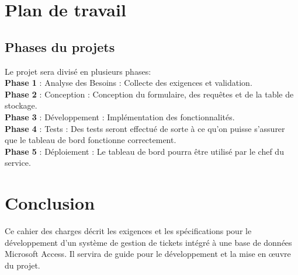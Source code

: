 \documentclass[a4paper,12pt]{article}
\begin{document}
\section{Plan de travail}

\subsection{Phases du projets}
Le projet sera divisé en plusieurs phases: \\
\noindent \textbf{Phase 1} : Analyse des Besoins : Collecte des exigences et validation. \\
\noindent \textbf{Phase 2} : Conception : Conception du formulaire, des requêtes et de la table de stockage. \\
\noindent \textbf{Phase 3} : Développement : Implémentation des fonctionnalités. \\
\noindent \textbf{Phase 4} : Tests : Des tests seront effectué de sorte à ce qu'on puisse s'assurer que le tableau de bord fonctionne correctement. \\
\noindent \textbf{Phase 5} : Déploiement : Le tableau de bord pourra être utilisé par le chef du service. \\



\section{Conclusion}

Ce cahier des charges décrit les exigences et les spécifications pour le développement d'un système de gestion de tickets intégré à une base de données Microsoft Access. Il servira de guide pour le développement et la mise en œuvre du projet.
\end{document}
